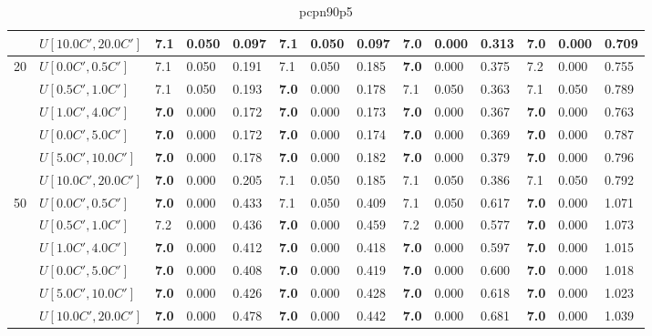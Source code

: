 \begin{table}[h]
{\begin{tabular}{|l|l||l|l|l||l|l|l||l|l|l||l|l|l|}
       & $U[10.0C',20.0C']$ & 7.1 & 0.050 & 0.097 & 7.1 & 0.050 & 0.097 & \textbf{7.0} & 0.000 & 0.313 & \textbf{7.0} & 0.000 & 0.709 \\
      \hline\hline
      \multirow{6}{*}{20} & $U[0.0C',0.5C']$ & 7.1 & 0.050 & 0.191 & 7.1 & 0.050 & 0.185 & \textbf{7.0} & 0.000 & 0.375 & 7.2 & 0.000 & 0.755 \\
       & $U[0.5C',1.0C']$ & 7.1 & 0.050 & 0.193 & \textbf{7.0} & 0.000 & 0.178 & 7.1 & 0.050 & 0.363 & 7.1 & 0.050 & 0.789 \\
       & $U[1.0C',4.0C']$ & \textbf{7.0} & 0.000 & 0.172 & \textbf{7.0} & 0.000 & 0.173 & \textbf{7.0} & 0.000 & 0.367 & \textbf{7.0} & 0.000 & 0.763 \\
       & $U[0.0C',5.0C']$ & \textbf{7.0} & 0.000 & 0.172 & \textbf{7.0} & 0.000 & 0.174 & \textbf{7.0} & 0.000 & 0.369 & \textbf{7.0} & 0.000 & 0.787 \\
       & $U[5.0C',10.0C']$ & \textbf{7.0} & 0.000 & 0.178 & \textbf{7.0} & 0.000 & 0.182 & \textbf{7.0} & 0.000 & 0.379 & \textbf{7.0} & 0.000 & 0.796 \\
       & $U[10.0C',20.0C']$ & \textbf{7.0} & 0.000 & 0.205 & 7.1 & 0.050 & 0.185 & 7.1 & 0.050 & 0.386 & 7.1 & 0.050 & 0.792 \\
      \hline\hline
      \multirow{6}{*}{50} & $U[0.0C',0.5C']$ & \textbf{7.0} & 0.000 & 0.433 & 7.1 & 0.050 & 0.409 & 7.1 & 0.050 & 0.617 & \textbf{7.0} & 0.000 & 1.071 \\
       & $U[0.5C',1.0C']$ & 7.2 & 0.000 & 0.436 & \textbf{7.0} & 0.000 & 0.459 & 7.2 & 0.000 & 0.577 & \textbf{7.0} & 0.000 & 1.073 \\
       & $U[1.0C',4.0C']$ & \textbf{7.0} & 0.000 & 0.412 & \textbf{7.0} & 0.000 & 0.418 & \textbf{7.0} & 0.000 & 0.597 & \textbf{7.0} & 0.000 & 1.015 \\
       & $U[0.0C',5.0C']$ & \textbf{7.0} & 0.000 & 0.408 & \textbf{7.0} & 0.000 & 0.419 & \textbf{7.0} & 0.000 & 0.600 & \textbf{7.0} & 0.000 & 1.018 \\
       & $U[5.0C',10.0C']$ & \textbf{7.0} & 0.000 & 0.426 & \textbf{7.0} & 0.000 & 0.428 & \textbf{7.0} & 0.000 & 0.618 & \textbf{7.0} & 0.000 & 1.023 \\
       & $U[10.0C',20.0C']$ & \textbf{7.0} & 0.000 & 0.478 & \textbf{7.0} & 0.000 & 0.442 & \textbf{7.0} & 0.000 & 0.681 & \textbf{7.0} & 0.000 & 1.039 \\
      \hline
      \end{tabular}
      }
      \caption{pcpn90p5}
      \label{tab:pcpn90p5}\end{table}


